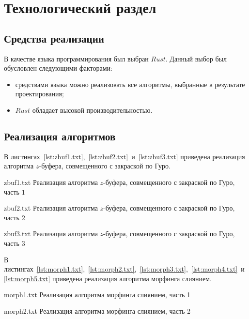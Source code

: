 \chapter{Технологический раздел}

\section{Средства реализации}

В качестве языка программирования был выбран $Rust$. Данный выбор был обусловлен следующими факторами:

\begin{itemize}[label*=---]
	\item средствами языка можно реализовать все алгоритмы, выбранные в результате проектирования;
	\item $Rust$ обладает высокой производительностью. \cite{RUST_IS_THE_BEST}
\end{itemize}

\clearpage

\section{Реализация алгоритмов}

В листингах~\ref{lst:zbuf1.txt},~\ref{lst:zbuf2.txt}~и~\ref{lst:zbuf3.txt} приведена реализация алгоритма $z$-буфера, совмещенного с закраской по Гуро. 

{zbuf1.txt}
{Реализация алгоритма $z$-буфера, совмещенного с закраской по Гуро, часть 1}

\clearpage

{zbuf2.txt}
{Реализация алгоритма $z$-буфера, совмещенного с закраской по Гуро, часть 2}

\clearpage

{zbuf3.txt}
{Реализация алгоритма $z$-буфера, совмещенного с закраской по Гуро, часть 3}

\clearpage

В листингах~\ref{lst:morph1.txt},~\ref{lst:morph2.txt},~\ref{lst:morph3.txt},~\ref{lst:morph4.txt}~и~\ref{lst:morph5.txt} приведена реализация алгоритма морфинга слиянием. 

{morph1.txt}
{Реализация алгоритма морфинга слиянием, часть 1}

\clearpage

{morph2.txt}
{Реализация алгоритма морфинга слиянием, часть 2}

